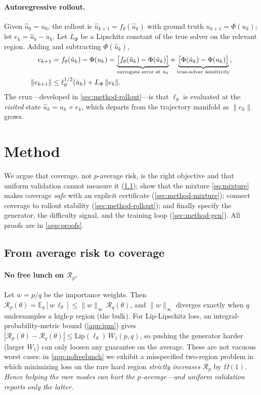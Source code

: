 \documentclass{article}
\theoremstyle{plain}
\theoremstyle{definition}
\theoremstyle{remark}
\newcommand{\E}{\mathbb{E}}
\newcommand{\state}{u}
\newcommand{\sol}{\Phi}
\newcommand{\surr}{f_\theta}
\newcommand{\lossf}{\ell_\theta}
\newcommand{\pnat}{p}
\newcommand{\qtr}{q}
\newcommand{\Rp}{\mathcal{R}_{\pnat}}
\newcommand{\Rq}{\mathcal{R}_{\qtr}}
\newcommand{\Lip}{\mathrm{Lip}}
\begin{document}
\paragraph{Autoregressive rollout.}
Given $\hat\state_0=\state_0$, the rollout is $\hat\state_{k+1}=\surr(\hat\state_k)$ with ground truth
$\state_{k+1}=\sol(\state_k)$; let $e_k=\hat\state_k-\state_k$. Let $L_{\sol}$ be a Lipschitz constant of
the true solver on the relevant region. Adding and subtracting $\sol(\hat\state_k)$,
\begin{align}
  e_{k+1}
  &= \surr(\hat\state_k)-\sol(\state_k)
   = \underbrace{\bigl[\surr(\hat\state_k)-\sol(\hat\state_k)\bigr]}_{\text{surrogate error at }\hat\state_k}
   + \underbrace{\bigl[\sol(\hat\state_k)-\sol(\state_k)\bigr]}_{\text{true-solver sensitivity}},
   \notag\\[-1pt]
  \|e_{k+1}\| &\le \lossf^{1/2}(\hat\state_k) + L_{\sol}\,\|e_k\|.
  \label{eq:rollout-recursion}
\end{align}
The crux---developed in \cref{sec:method-rollout}---is that $\lossf$ is evaluated at the \emph{visited}
state $\hat\state_k=\state_k+e_k$, which departs from the trajectory manifold as $\|e_k\|$ grows.

\section{Method}\label{sec:method}
We argue that coverage, not $\pnat$-average risk, is the right objective and that uniform validation
cannot measure it (\cref{sec:method-objective}); show that the mixture \eqref{eq:mixture} makes coverage
\emph{safe} with an explicit certificate (\cref{sec:method-mixture}); connect coverage to rollout
stability (\cref{sec:method-rollout}); and finally specify the generator, the difficulty signal, and the
training loop (\cref{sec:method-gen}). All proofs are in \cref{app:proofs}.

\subsection{From average risk to coverage}\label{sec:method-objective}
\paragraph{No free lunch on $\Rp$.}
Let $w=\pnat/\qtr$ be the importance weights. Then $\Rp(\theta)=\E_{\qtr}[w\,\lossf]\le
\|w\|_\infty\,\Rq(\theta)$, and $\|w\|_\infty$ diverges exactly when $\qtr$ undersamples a high-$\pnat$
region (the bulk). For $\Lip$-Lipschitz loss, an integral-probability-metric bound (\cref{app:ipm})
gives $|\Rp(\theta)-\Rq(\theta)|\le \Lip(\lossf)\,W_1(\pnat,\qtr)$, so pushing the generator harder
(larger $W_1$) can only loosen any guarantee on the average. These are not vacuous worst cases: in
\cref{app:nofreelunch} we exhibit a misspecified two-region problem in which minimizing loss on the rare
hard region \emph{strictly increases} $\Rp$ by $\Omega(1)$. \emph{Hence helping the rare modes can hurt
the $\pnat$-average---and uniform validation reports only the latter.}
\end{document}
